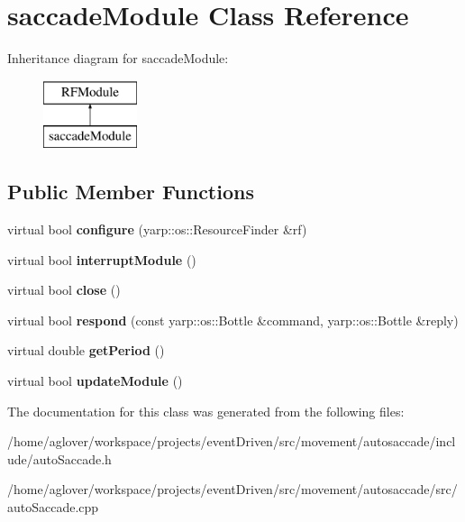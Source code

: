 \hypertarget{classsaccadeModule}{\section{saccade\-Module Class Reference}
\label{classsaccadeModule}
}
Inheritance diagram for saccade\-Module\-:\begin{figure}[H]
\begin{center}
\leavevmode
\includegraphics[height=2.000000cm]{classsaccadeModule}
\end{center}
\end{figure}
\subsection*{Public Member Functions}
\begin{DoxyCompactItemize}
\item 
\hypertarget{classsaccadeModule_aad1f5d8c2f33c4c9dadb8e015de9cafc}{virtual bool {\bfseries configure} (yarp\-::os\-::\-Resource\-Finder \&rf)}\label{classsaccadeModule_aad1f5d8c2f33c4c9dadb8e015de9cafc}

\item 
\hypertarget{classsaccadeModule_ac249486e8d00cdb52ec316c5665032ee}{virtual bool {\bfseries interrupt\-Module} ()}\label{classsaccadeModule_ac249486e8d00cdb52ec316c5665032ee}

\item 
\hypertarget{classsaccadeModule_a510ff21af86c5ccf330cf334e63d0f4f}{virtual bool {\bfseries close} ()}\label{classsaccadeModule_a510ff21af86c5ccf330cf334e63d0f4f}

\item 
\hypertarget{classsaccadeModule_a4392d2dc4f60014da07b12772f216430}{virtual bool {\bfseries respond} (const yarp\-::os\-::\-Bottle \&command, yarp\-::os\-::\-Bottle \&reply)}\label{classsaccadeModule_a4392d2dc4f60014da07b12772f216430}

\item 
\hypertarget{classsaccadeModule_a8e603e09181d0cf26b020e6808b9a120}{virtual double {\bfseries get\-Period} ()}\label{classsaccadeModule_a8e603e09181d0cf26b020e6808b9a120}

\item 
\hypertarget{classsaccadeModule_abb6ee7b679476de9ff75d78b75709e9d}{virtual bool {\bfseries update\-Module} ()}\label{classsaccadeModule_abb6ee7b679476de9ff75d78b75709e9d}

\end{DoxyCompactItemize}


The documentation for this class was generated from the following files\-:\begin{DoxyCompactItemize}
\item 
/home/aglover/workspace/projects/event\-Driven/src/movement/autosaccade/include/auto\-Saccade.\-h\item 
/home/aglover/workspace/projects/event\-Driven/src/movement/autosaccade/src/auto\-Saccade.\-cpp\end{DoxyCompactItemize}
